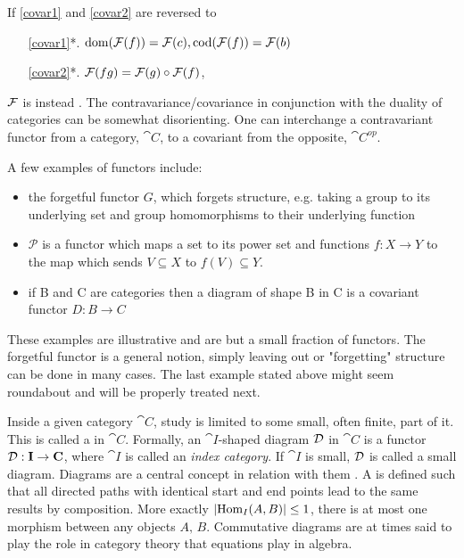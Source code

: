 \documentclass[../../main.tex]{subfiles}
\begin{document}
    If \ref{covar1} and \ref{covar2} are reversed to
    
    \begin{enumerate}
        \item [\ref{covar1}*.] $\mathrm{dom}(\mathcal{F}(f)) = \mathcal{F}(c), \mathrm{cod}(\mathcal{F}(f)) = \mathcal{F}(b)$ \label{cov1}
        \item [\ref{covar2}*.] $\mathcal{F}(fg) = \mathcal{F}(g) \circ \mathcal{F}(f)$, \label{cov2}
    \end{enumerate}

    $\mathcal{F}$ is instead . The contravariance/covariance in conjunction with the duality of categories can be somewhat disorienting. One can interchange a contravariant functor from a category, $\cat{C}$, to a covariant from the opposite, $\cat{C^{op}}$.

    \begin{example}\label{functor_exmp}
        A few examples of functors include:
        \begin{itemize}
            \item the forgetful functor $G$, which forgets structure, e.g. taking a group to its underlying set and group homomorphisms to their underlying function
            \item $\mathcal{P}$ is a functor which maps a set to its power set and functions $f:X\to Y$ to the map which sends $V\subseteq X $ to $f(V)\subseteq Y$. 
            \item if B and C are categories then a diagram of shape B in C is a covariant functor $D:B\to C$
        \end{itemize}
    \end{example}

    These examples are illustrative and are but a small fraction of functors. The forgetful functor is a general notion, simply leaving out or "forgetting" structure can be done in many cases. The last example stated above might seem roundabout and will be properly treated next. 
    
    Inside a given category $\cat{C}$, study is limited to some small, often finite, part of it. This is called a  in $\cat{C}$. Formally, an $\cat{I}$-shaped diagram $\mathcal{D}$ in $\cat{C}$ is a functor $\mathcal{D}: \mathbf{I} \to \mathbf{C}$, where $\cat{I}$ is called an \emph{index category}. If $\cat{I}$ is small, $\mathcal{D}$ is called a small diagram. Diagrams are a central concept in relation with them . A  is defined such that all directed paths with identical start and end points lead to the same results by composition. More exactly $|\text{Hom}_I(A,B)|\leq 1$, there is at most one morphism between any objects $A,\,B$. Commutative diagrams are at times said to play the role in category theory that equations play in algebra.
    
\end{document}

